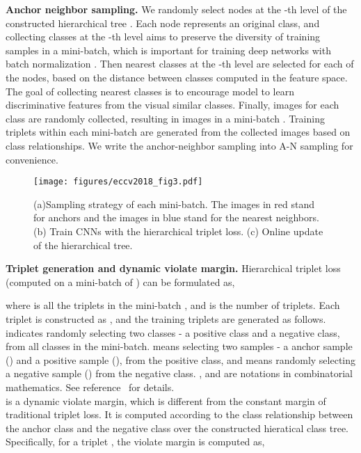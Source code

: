 \documentclass[runningheads]{llncs}
\begin{document}
\noindent\textbf{Anchor neighbor sampling.} We randomly select  nodes at the -th level of the constructed hierarchical tree . Each node represents an original class, and collecting classes at the -th level aims to  preserve the diversity of training samples in a mini-batch, which is important for training deep networks with batch normalization \cite{ioffe2015batch}. Then  nearest classes at the -th level are selected for each of the  nodes, based on the distance between classes computed in the feature space. The goal of collecting nearest classes is to encourage model to learn discriminative features from the visual similar classes. Finally,  images for each class are randomly collected, resulting in  images in a mini-batch . Training triplets within each mini-batch  are generated from the collected  images based on class relationships. We write the anchor-neighbor sampling into A-N sampling for convenience. \\

\begin{figure*}[ht]
  \centering
  \texttt{[image: figures/eccv2018\_fig3.pdf]}
  \caption{(a)Sampling strategy of each mini-batch. The images in red stand for anchors and the images in blue stand for the nearest neighbors. (b) Train CNNs with the hierarchical triplet loss. (c) Online update of the hierarchical tree.}
  \label{Fig:Overview}
\end{figure*}

\noindent\textbf{Triplet generation and dynamic violate margin.}
Hierarchical triplet loss (computed on a mini-batch of  ) can be formulated as,

    
where  is all the triplets in the mini-batch , and  is the number of triplets. Each triplet is constructed as , and the training triplets are generated as follows.  indicates randomly selecting two classes - a positive class and a negative class, from all  classes in the mini-batch.  means selecting two samples - a anchor sample () and a positive sample (), from the positive class, and  means randomly selecting a negative sample () from the negative class. ,  and  are notations in combinatorial mathematics. See reference~\cite{van2001course} for details. \\

  is a dynamic violate margin, which is different from the constant margin of traditional triplet loss. It is computed according to the class relationship between the anchor class  and the negative class  over the constructed hieratical class tree. Specifically, for a triplet , the violate margin  is computed as,
    
\end{document}

